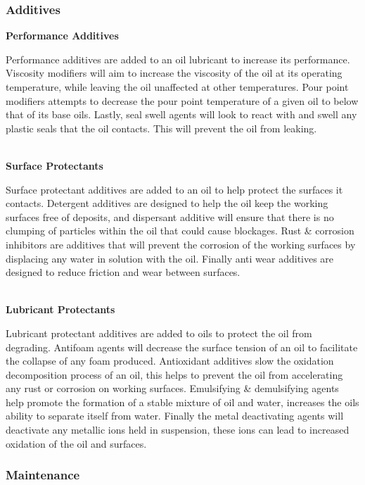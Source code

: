 \documentclass[a4paper,11pt]{article}
\begin{document}
\subsubsection{Additives}
\label{additives}

\textbf{Performance Additives}

Performance additives are added to an oil lubricant to increase its performance. Viscosity modifiers will aim to increase the viscosity of the oil at its operating temperature, while leaving the oil unaffected at other temperatures. Pour point modifiers attempts to decrease the pour point temperature of a given oil to below that of its base oils. Lastly, seal swell agents will look to react with and swell any plastic seals that the oil contacts. This will prevent the oil from leaking.  

\textbf{\\Surface Protectants}

Surface protectant additives are added to an oil to help protect the surfaces it contacts. Detergent additives are designed to help the oil keep the working surfaces free of deposits, and dispersant additive will ensure that there is no clumping of particles within the oil that could cause blockages. Rust \& corrosion inhibitors are additives that will prevent the corrosion of the working surfaces by displacing any water in solution with the oil. Finally anti wear additives are designed to reduce friction and wear between surfaces. 

\textbf{\\Lubricant Protectants} 

Lubricant protectant additives are added to oils to protect the oil from degrading. Antifoam agents will decrease the surface tension of an oil to facilitate the collapse of any foam produced. Antioxidant additives slow the oxidation decomposition process of an oil, this helps to prevent the oil from accelerating any rust or corrosion on working surfaces. Emulsifying \& demulsifying agents help promote the formation of a stable mixture of oil and water, increases the oils ability to separate itself from water. Finally the metal deactivating agents will deactivate any metallic ions held in suspension, these ions can lead to increased oxidation of the oil and surfaces.   


\subsubsection{Maintenance}
\end{document}
